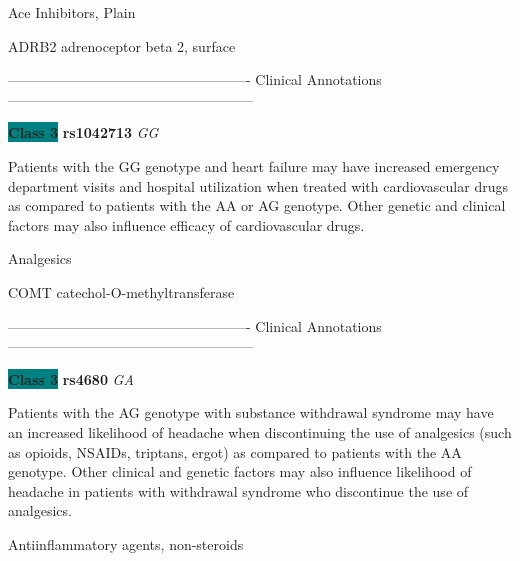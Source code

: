 \documentclass{resume} %
\begin{document}
\begin{rSection}{ Ace Inhibitors, Plain }
\item[]

\begin{rSubsection}{ ADRB2 }{ adrenoceptor beta 2, surface }{}{}
\item[]

\item[] ---------------------------------------------------- Clinical Annotations -----------------------------------------------------\newline
\item \textbf{\colorbox{teal} {Class 3}} \textbf{ rs1042713 } \textit{ GG }
\item[] Patients with the GG genotype and heart failure may have increased emergency department visits and hospital utilization when treated with cardiovascular drugs as compared to patients with the AA or AG genotype. Other genetic and clinical factors may also influence efficacy of cardiovascular drugs.
\end{rSubsection}

\end{rSection}\begin{rSection}{ Analgesics }
\item[]

\begin{rSubsection}{ COMT }{ catechol-O-methyltransferase }{}{}
\item[]

\item[] ---------------------------------------------------- Clinical Annotations -----------------------------------------------------\newline
\item \textbf{\colorbox{teal} {Class 3}} \textbf{ rs4680 } \textit{ GA }
\item[] Patients with the AG genotype with substance withdrawal syndrome may have an increased likelihood of headache when discontinuing the use of analgesics (such as opioids, NSAIDs, triptans, ergot) as compared to patients with the AA genotype. Other clinical and genetic factors may also influence likelihood of headache in patients with withdrawal syndrome who discontinue the use of analgesics.
\end{rSubsection}

\end{rSection}\begin{rSection}{ Antiinflammatory agents, non-steroids }
\item[]


\end{rSection}
\end{document}
